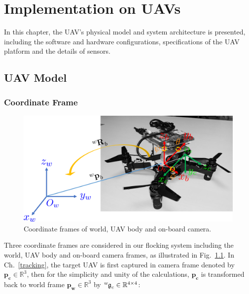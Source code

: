\chapter{Implementation on UAVs}\label{implementation}

In this chapter, the UAV's physical model and system architecture is presented, including the software and hardware configurations, specifications of the UAV platform and the details of sensors.

\section{UAV Model}\label{uav_model}

\subsection{Coordinate Frame}

\begin{figure}[htb]
  \centering
  \includegraphics[width=1.0\textwidth]{figure/chapter_4/coordinate.png}
  \caption{Coordinate frames of world, UAV body and on-board camera.}
  \label{fig:coordinate}
\end{figure}

Three coordinate frames are considered in our flocking system including the world, UAV body and on-board camera frames, as illustrated in Fig.~\ref{fig:coordinate}. In Ch.~\ref{tracking}, the target UAV is first captured in camera frame denoted by $\mathbf{p_c}\in\mathbb{R}^3$, then for the simplicity and unity of the calculations, $\mathbf{p_c}$ is transformed back to world frame $\mathbf{p_w}\in\mathbb{R}^3$ by $\tensor*[^w]{\mathfrak{g}}{_c}\in\mathbb{R}^{4\times4}$:

